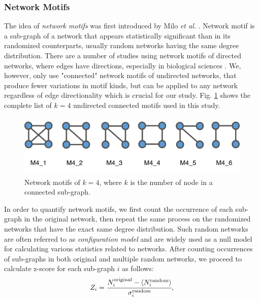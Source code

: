 \documentclass{article}
\begin{document}
	\subsubsection{Network Motifs} 
The idea of \textit{network motifs} was first introduced by Milo \textit{et al.} \cite{Milo_motif}. Network motif is a sub-graph of a network that appears statistically significant than in its randomized counterparts, usually random networks having the same degree distribution. There are a number of studies using network motifs of directed networks, where edges have directions, especially in biological sciences \cite{Alon2007, MotifsInBrain}. We, however, only use "connected" network motifs of undirected networks, that produce fewer variations in motif kinds, but can be applied to any network regardless of edge directionality which is crucial for our study. Fig. \ref{motifs} shows the complete list of $k=4$ undirected connected motifs used in this study.

\begin{figure}[ht]
	\begin{center}
		\vspace{0.5cm}
		\includegraphics[clip,width=12cm,height = 3cm]{figs/motifs.png}
		\vspace{0.5cm}
		\caption{Network motifs of $k =4$, where $k$ is the number of node in a connected sub-graph.}
		\label{motifs}
	\end{center}
\end{figure}

In order to quantify network motifs, we first count the occurrence of each sub-graph in the original network, then repeat the same process on the randomized networks that have the exact same degree distribution. Such random networks are often referred to as \textit{configuration model} and are widely used as a null model for calculating various statistics related to networks. After counting occurrences of sub-graphs in both original and multiple random networks, we proceed to calculate z-score for each sub-graph $i$ as follows:
	\begin{equation}
	Z_i = \cfrac{N_i^{\text{original}} - \langle N_i^{\text{random}} \rangle }{\sigma_i^{\text{random}}},
	\end{equation}
\end{document}
